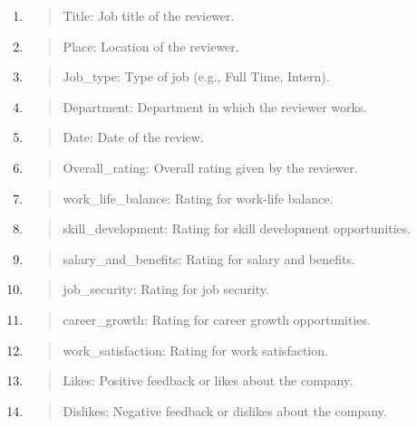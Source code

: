 \documentclass[
]{article}
\begin{document}
\begin{enumerate}
\def\labelenumi{\arabic{enumi}.}
\item
  \begin{quote}
  Title: Job title of the reviewer.
  \end{quote}
\item
  \begin{quote}
  Place: Location of the reviewer.
  \end{quote}
\item
  \begin{quote}
  Job\_type: Type of job (e.g., Full Time, Intern).
  \end{quote}
\item
  \begin{quote}
  Department: Department in which the reviewer works.
  \end{quote}
\item
  \begin{quote}
  Date: Date of the review.
  \end{quote}
\item
  \begin{quote}
  Overall\_rating: Overall rating given by the reviewer.
  \end{quote}
\item
  \begin{quote}
  work\_life\_balance: Rating for work-life balance.
  \end{quote}
\item
  \begin{quote}
  skill\_development: Rating for skill development opportunities.
  \end{quote}
\item
  \begin{quote}
  salary\_and\_benefits: Rating for salary and benefits.
  \end{quote}
\item
  \begin{quote}
  job\_security: Rating for job security.
  \end{quote}
\item
  \begin{quote}
  career\_growth: Rating for career growth opportunities.
  \end{quote}
\item
  \begin{quote}
  work\_satisfaction: Rating for work satisfaction.
  \end{quote}
\item
  \begin{quote}
  Likes: Positive feedback or likes about the company.
  \end{quote}
\item
  \begin{quote}
  Dislikes: Negative feedback or dislikes about the company.
  \end{quote}
\end{enumerate}
\end{document}
